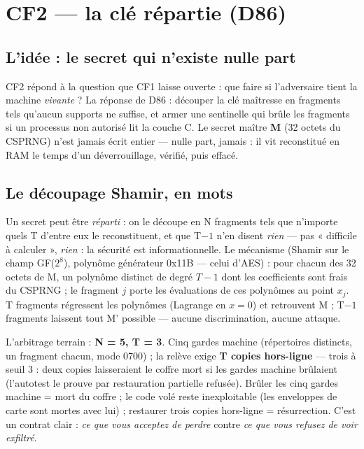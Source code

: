 \section{CF2 — la clé répartie (D86)}\label{sec:cf2}

\subsection{L'idée : le secret qui n'existe nulle part}

CF2 répond à la question que CF1 laisse ouverte : que faire si l'adversaire tient la
machine \emph{vivante} ? La réponse de D86 : découper la clé maîtresse en fragments
tels qu'aucun supports ne suffise, et armer une sentinelle qui brûle les fragments si
un processus non autorisé lit la couche C. Le secret maître \textbf{M} (32 octets du
CSPRNG) n'est jamais écrit entier — nulle part, jamais : il vit reconstitué en RAM le
temps d'un déverrouillage, vérifié, puis effacé.

\subsection{Le découpage Shamir, en mots}

Un secret peut être \emph{réparti} : on le découpe en N fragments tels que n'importe
quels T d'entre eux le reconstituent, et que T$-1$ n'en disent \emph{rien} — pas
« difficile à calculer », \emph{rien} : la sécurité est informationnelle. Le mécanisme
(Shamir sur le champ GF($2^8$), polynôme générateur 0x11B — celui d'AES) : pour chacun
des 32 octets de M, un polynôme distinct de degré $T-1$ dont les coefficients sont
frais du CSPRNG ; le fragment $j$ porte les évaluations de ces polynômes au point
$x_j$. T fragments régressent les polynômes (Lagrange en $x=0$) et retrouvent M ;
T$-1$ fragments laissent tout M' possible — aucune discrimination, aucune attaque.

L'arbitrage terrain : \textbf{N = 5, T = 3}. Cinq gardes machine (répertoires distincts,
un fragment chacun, mode 0700) ; la relève exige \textbf{T copies hors-ligne} — trois
à seuil 3 : deux copies laisseraient le coffre mort si les gardes machine brûlaient
(l'autotest le prouve par restauration partielle refusée). Brûler les cinq gardes
machine = mort du coffre ; le code volé reste inexploitable (les enveloppes de carte
sont mortes avec lui) ; restaurer trois copies hors-ligne = résurrection. C'est un
contrat clair : \emph{ce que vous acceptez de perdre} contre \emph{ce que vous refusez
de voir exfiltré}.

